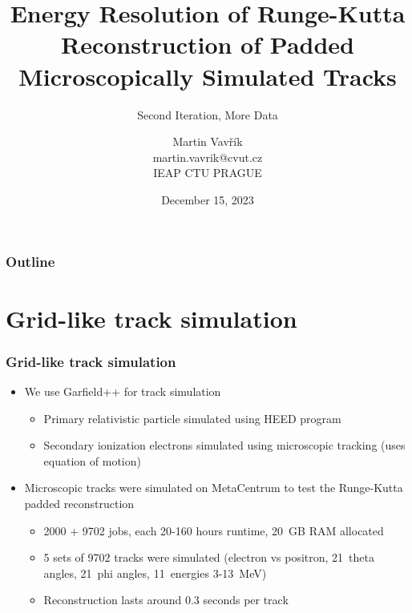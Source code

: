 \documentclass{beamer}
\title[Runge-Kutta Algorithm Energy Resolution]{Energy Resolution of Runge-Kutta Reconstruction of Padded Microscopically Simulated Tracks}
\subtitle{Second Iteration, More Data}
\author[M.~Vavřík]{\foreignlanguage{czech}{Martin Vavřík}\vspace{0.5cm}\\martin.vavrik@cvut.cz\\IEAP CTU PRAGUE\\}
\date{December 15, 2023}
\begin{document}
	
	\begin{frame}
		\titlepage
	\end{frame}
	
	\begin{frame}
		\frametitle{Outline}
		\tableofcontents
	\end{frame}
	
	\section{Grid-like track simulation}
	\begin{frame}
		\frametitle{Grid-like track simulation}
		\begin{itemize}
			\item We use Garfield++ for track simulation
			\begin{itemize}
				\item Primary relativistic particle simulated using HEED program~\cite{heed}
				\item Secondary ionization electrons simulated using microscopic tracking (uses equation of motion)
			\end{itemize}
			\item Microscopic tracks were simulated on MetaCentrum to test the Runge-Kutta padded reconstruction
			\begin{itemize}
				\item 2000 + 9702 jobs, each 20-160 hours runtime, 20~GB RAM allocated
				\item 5 sets of 9702 tracks were simulated (electron vs positron, 21~theta angles, 21~phi angles, 11~energies 3-13~MeV)
				\item Reconstruction lasts around 0.3 seconds per track
			\end{itemize}
		\end{itemize}
	\end{frame}
	
\end{document}
